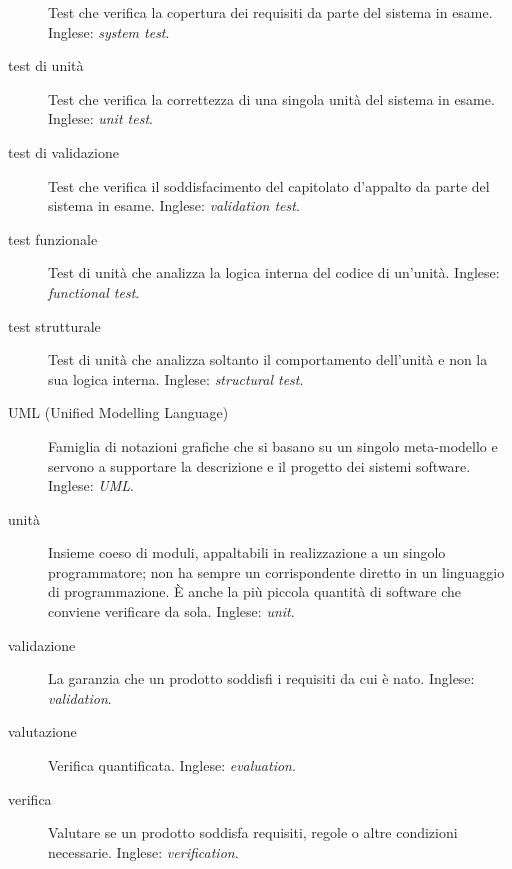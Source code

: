 \documentclass[a4paper]{article}
\begin{document}
\begin{description}
			Test che verifica la copertura dei requisiti da parte del sistema in esame. Inglese: \emph{system test}.
			
	\item[test di unità] 

			Test che verifica la correttezza di una singola unità del sistema in esame. Inglese: \emph{unit test}.
			
	\item[test di validazione] 

			Test che verifica il soddisfacimento del capitolato d'appalto da parte del sistema in esame. Inglese: \emph{validation test}.
			
	\item[test funzionale] 

			Test di unità che analizza la logica interna del codice di un'unità. Inglese: \emph{functional test}.
			
	\item[test strutturale] 

			Test di unità che analizza soltanto il comportamento dell'unità e non la sua logica interna. Inglese: \emph{structural test}.
			
	\item[UML (Unified Modelling Language)] 

			Famiglia di notazioni grafiche che si basano su un singolo meta-modello e servono a supportare la descrizione e il progetto dei sistemi software. Inglese: \emph{UML}.
			
	\item[unità] 

			Insieme coeso di moduli, appaltabili in realizzazione a un singolo programmatore; non ha sempre un corrispondente diretto in un linguaggio di programmazione. È anche la più piccola quantità di software che conviene verificare da sola. Inglese: \emph{unit}.
			
	\item[validazione] 

			La garanzia che un prodotto soddisfi i requisiti da cui è nato. Inglese: \emph{validation}.
			
	\item[valutazione] 

			Verifica quantificata. Inglese: \emph{evaluation}.
			
	\item[verifica] 

			Valutare se un prodotto soddisfa requisiti, regole o altre condizioni necessarie. Inglese: \emph{verification}.
			

\end{description}
\end{document}
